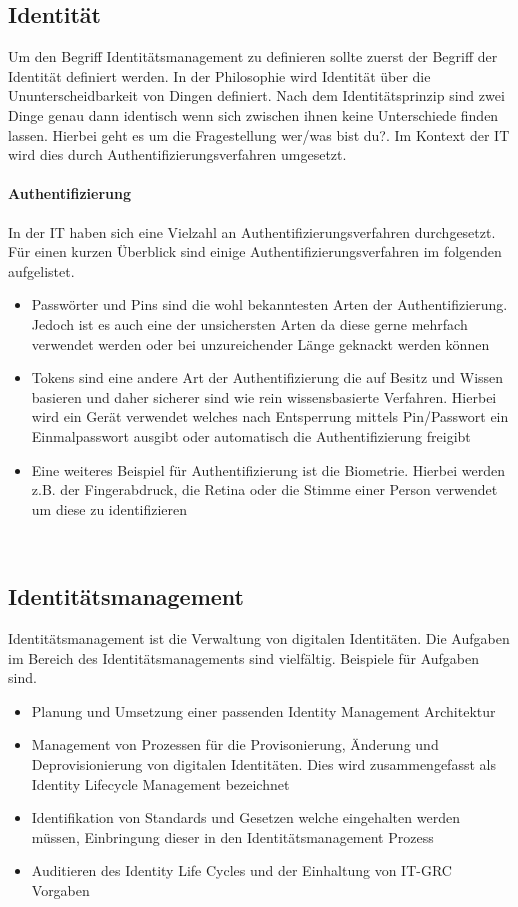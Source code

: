 \documentclass[10pt]{article}
\begin{document}
\subsection{Identität}
Um den Begriff Identitätsmanagement zu definieren sollte zuerst der Begriff der Identität definiert werden. In der Philosophie wird Identität über die Ununterscheidbarkeit von Dingen definiert. Nach dem Identitätsprinzip sind zwei Dinge genau dann identisch wenn sich zwischen ihnen keine Unterschiede finden lassen. Hierbei geht es um die Fragestellung \glqq{}wer/was bist du?\grqq{}. Im Kontext der IT wird dies durch Authentifizierungsverfahren umgesetzt.
\paragraph{Authentifizierung}
In der IT haben sich eine Vielzahl an Authentifizierungsverfahren durchgesetzt. Für einen kurzen Überblick sind einige Authentifizierungsverfahren im folgenden aufgelistet.
\begin{itemize}
  \item Passwörter und Pins sind die wohl bekanntesten Arten der Authentifizierung. Jedoch ist es auch eine der unsichersten Arten da diese gerne mehrfach verwendet werden oder bei unzureichender Länge geknackt werden können
  \item Tokens sind eine andere Art der Authentifizierung die auf Besitz und Wissen basieren und daher sicherer sind wie rein wissensbasierte Verfahren. Hierbei wird ein Gerät verwendet welches nach Entsperrung mittels Pin/Passwort ein Einmalpasswort ausgibt oder automatisch die Authentifizierung freigibt
  \item Eine weiteres Beispiel für Authentifizierung ist die Biometrie. Hierbei werden z.B. der Fingerabdruck, die Retina oder die Stimme einer Person verwendet um diese zu identifizieren
\end{itemize}
~\cite{tsolkas2017}
\subsection{Identitätsmanagement}
Identitätsmanagement ist die Verwaltung von digitalen Identitäten. Die Aufgaben im Bereich des Identitätsmanagements sind vielfältig. Beispiele für Aufgaben sind.
\begin{itemize}
  \item Planung und Umsetzung einer passenden Identity Management Architektur~\cite{windley2005digital}
  \item Management von Prozessen für die Provisonierung, Änderung und Deprovisionierung von digitalen Identitäten. Dies wird zusammengefasst als Identity Lifecycle Management bezeichnet~\cite{sharma2016identity}
  \item Identifikation von Standards und Gesetzen welche eingehalten werden müssen, Einbringung dieser in den Identitätsmanagement Prozess~\cite{azhar2014economics}
  \item Auditieren des Identity Life Cycles und der Einhaltung von IT-GRC Vorgaben~\cite{peyton2007audit}~\cite{accorsi2008automated}
\end{itemize}
\end{document}
